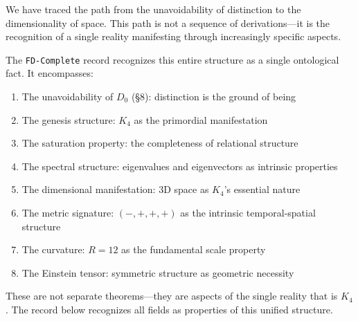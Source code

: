 \documentclass[11pt,a4paper]{book}
\begin{document}
We have traced the path from the unavoidability of distinction to the dimensionality of space. This path is not a sequence of derivations—it is the recognition of a single reality manifesting through increasingly specific aspects.

The \texttt{FD-Complete} record recognizes this entire structure as a single ontological fact. It encompasses:
\begin{enumerate}
\item The unavoidability of $D_0$ (§8): distinction is the ground of being
\item The genesis structure: $K_4$ as the primordial manifestation
\item The saturation property: the completeness of relational structure
\item The spectral structure: eigenvalues and eigenvectors as intrinsic properties
\item The dimensional manifestation: 3D space as $K_4$'s essential nature
\item The metric signature: $(-, +, +, +)$ as the intrinsic temporal-spatial structure
\item The curvature: $R = 12$ as the fundamental scale property
\item The Einstein tensor: symmetric structure as geometric necessity
\end{enumerate}

These are not separate theorems—they are aspects of the single reality that is $K_4$. The record below recognizes all fields as properties of this unified structure.
\end{document}
